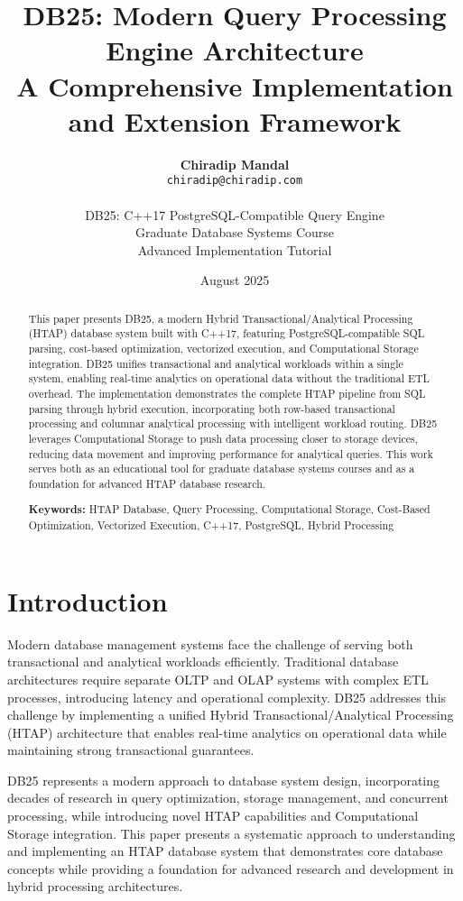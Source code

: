 \documentclass[12pt,a4paper]{article}
\title{\textbf{DB25: Modern Query Processing Engine Architecture \\
A Comprehensive Implementation and Extension Framework}}
\author{
    \textbf{Chiradip Mandal} \\
    \texttt{chiradip@chiradip.com} \\
    \\
    DB25: C++17 PostgreSQL-Compatible Query Engine \\
    Graduate Database Systems Course \\
    Advanced Implementation Tutorial
}
\date{August 2025}
\begin{document}
    \maketitle

    \begin{abstract}
        This paper presents DB25, a modern Hybrid Transactional/Analytical Processing (HTAP) database system built with C++17, featuring PostgreSQL-compatible SQL parsing, cost-based optimization, vectorized execution, and Computational Storage integration. DB25 unifies transactional and analytical workloads within a single system, enabling real-time analytics on operational data without the traditional ETL overhead. The implementation demonstrates the complete HTAP pipeline from SQL parsing through hybrid execution, incorporating both row-based transactional processing and columnar analytical processing with intelligent workload routing. DB25 leverages Computational Storage to push data processing closer to storage devices, reducing data movement and improving performance for analytical queries. This work serves both as an educational tool for graduate database systems courses and as a foundation for advanced HTAP database research.

        \textbf{Keywords:} HTAP Database, Query Processing, Computational Storage, Cost-Based Optimization, Vectorized Execution, C++17, PostgreSQL, Hybrid Processing
    \end{abstract}

    \tableofcontents
    \newpage

    \section{Introduction}

    Modern database management systems face the challenge of serving both transactional and analytical workloads efficiently. Traditional database architectures require separate OLTP and OLAP systems with complex ETL processes, introducing latency and operational complexity. DB25 addresses this challenge by implementing a unified Hybrid Transactional/Analytical Processing (HTAP) architecture that enables real-time analytics on operational data while maintaining strong transactional guarantees.

    DB25 represents a modern approach to database system design, incorporating decades of research in query optimization, storage management, and concurrent processing, while introducing novel HTAP capabilities and Computational Storage integration. This paper presents a systematic approach to understanding and implementing an HTAP database system that demonstrates core database concepts while providing a foundation for advanced research and development in hybrid processing architectures.
\end{document}
